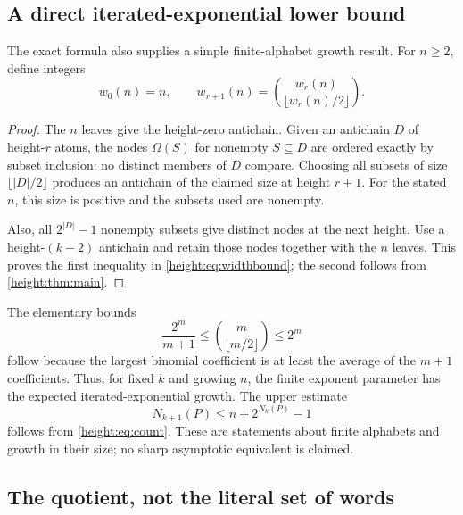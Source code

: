\documentclass[11pt,a4paper]{article}
\numberwithin{equation}{section}
\newtheorem{proposition}[theorem]{Proposition}
\theoremstyle{definition}
\theoremstyle{remark}
\newcommand{\mot}{\mathop{o}}
\newcommand{\Vheight}{\mathcal V}
\begin{document}
\subsection{A direct iterated-exponential lower bound}

The exact formula also supplies a simple finite-alphabet growth result.
For $n\ge2$, define integers
\[
  w_0(n)=n,\qquad
  w_{r+1}(n)=\binom{w_r(n)}{\lfloor w_r(n)/2\rfloor}.
\]


\begin{proof}
The $n$ leaves give the height-zero antichain. Given an antichain $D$ of
height-$r$ atoms, the nodes $\Omega(S)$ for nonempty $S\subseteq D$ are
ordered exactly by subset inclusion: no distinct members of $D$ compare.
Choosing all subsets of size $\lfloor|D|/2\rfloor$ produces an antichain
of the claimed size at height $r+1$. For the stated $n$, this size is
positive and the subsets used are nonempty.

Also, all $2^{|D|}-1$ nonempty subsets give distinct nodes at the next
height. Use a height-$(k-2)$ antichain and retain those nodes together with
the $n$ leaves. This proves the first inequality in \eqref{height:eq:widthbound};
the second follows from \cref{height:thm:main}.
\end{proof}

The elementary bounds
\[
  \frac{2^m}{m+1}\le\binom{m}{\lfloor m/2\rfloor}\le2^m
\]
follow because the largest binomial coefficient is at least the average
of the $m+1$ coefficients. Thus, for fixed $k$ and growing $n$, the
finite exponent parameter has the expected iterated-exponential growth.
The upper estimate
\[
  N_{k+1}(P)\le n+2^{N_k(P)}-1
\]
follows from \eqref{height:eq:count}. These are statements about finite alphabets
and growth in their size; no sharp asymptotic equivalent is claimed.

\subsection{The quotient, not the literal set of words}
\end{document}
